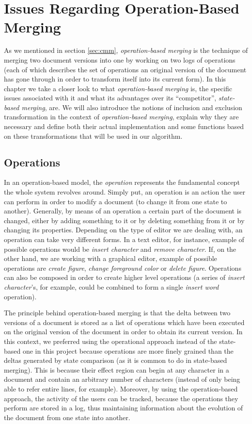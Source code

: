 \chapter{Issues Regarding Operation-Based Merging}
\label{chap:incexcl}

As we mentioned in section \ref{sec:cmm}, \emph{operation-based merging} is the
technique of merging two document versions into one by working on two logs of
operations (each of which describes the set of operations an original
version of the document has gone through in order to transform itself into its current
form). In this chapter we take a closer look to what \emph{operation-based merging}
is, the specific issues associated with it and what its advantages over its
``competitor'', \emph{state-based merging}, are. We will also introduce the
notions of inclusion and exclusion transformation in the context of
\emph{operation-based merging}, explain why they are necessary and define
both their actual implementation and some functions based on these transformations
that will be used in our algorithm.

\section{Operations}

In an operation-based model, the \emph{operation} represents the fundamental
concept the whole system revolves around. Simply put, an operation is an
action the user can perform in order to modify a document (to change it from one
state to another). Generally, by means of an operation a certain part of the
document is changed, either by adding something to it or by deleting something
from it or by changing its properties. Depending on the type of editor we are
dealing with, an operation can take very different forms. In a text editor,
for instance, example of possible operations would be \emph{insert character}
and \emph{remove character}. If, on the other hand, we are working with a
graphical editor, example of possible operations are \emph{create figure},
\emph{change foreground color} or \emph{delete figure}. Operations can also
be composed in order to create higher level operations (a series of
\emph{insert character}'s, for example, could be combined to form a single
\emph{insert word} operation).

The principle behind operation-based merging is that the delta between two
versions of a document is stored as a list of operations which have been
executed on the original version of the document in order to obtain its current
version. In this context, we preferred using the operational approach instead of
the state-based one in this project because operations are more finely grained
than the deltas generated by state comparison (as it is common to do in state-based
merging). This is because their effect region can begin at any character in a
document and contain an arbitrary number of characters (instead of only being
able to refer entire lines, for example). Moreover, by using the operation-based
approach, the activity of the users can be tracked, because the operations
they perform are stored in a log, thus maintaining information about the
evolution of the document from one state into another.


